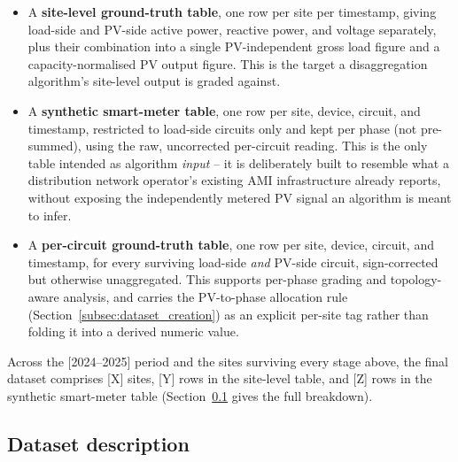 \begin{itemize}
  \item A \textbf{site-level ground-truth table}, one row per site per
    timestamp, giving load-side and PV-side active power, reactive power,
    and voltage separately, plus their combination into a single
    PV-independent gross load figure and a capacity-normalised PV output
    figure. This is the target a disaggregation algorithm's site-level
    output is graded against.
  \item A \textbf{synthetic smart-meter table}, one row per site, device,
    circuit, and timestamp, restricted to load-side circuits only and
    kept per phase (not pre-summed), using the raw, uncorrected
    per-circuit reading. This is the only table intended as algorithm
    \emph{input} -- it is deliberately built to resemble what a
    distribution network operator's existing AMI infrastructure already
    reports, without exposing the independently metered PV signal an
    algorithm is meant to infer.
  \item A \textbf{per-circuit ground-truth table}, one row per site,
    device, circuit, and timestamp, for every surviving load-side
    \emph{and} PV-side circuit, sign-corrected but otherwise
    unaggregated. This supports per-phase grading and topology-aware
    analysis, and carries the PV-to-phase allocation rule
    (Section~\ref{subsec:dataset_creation}) as an explicit per-site tag
    rather than folding it into a derived numeric value.
\end{itemize}

Across the [2024--2025] period and the sites surviving every stage above,
the final dataset comprises [X] sites, [Y] rows in the site-level table,
and [Z] rows in the synthetic smart-meter table (Section~\ref{subsec:dataset_description}
gives the full breakdown).

\subsection{Dataset description}
\label{subsec:dataset_description}

